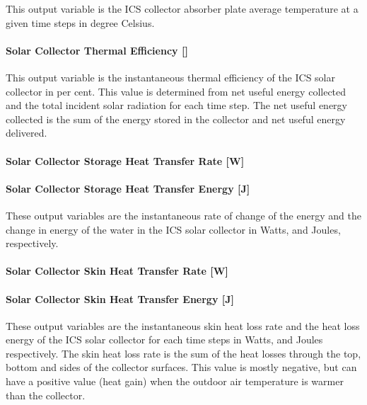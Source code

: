 This output variable is the ICS collector absorber plate average temperature at a given time steps in degree Celsius.

\paragraph{Solar Collector Thermal Efficiency {[]}}\label{solar-collector-thermal-efficiency}

This output variable is the instantaneous thermal efficiency of the ICS solar collector in per cent. This value is determined from net useful energy collected and the total incident solar radiation for each time step. The net useful energy collected is the sum of the energy stored in the collector and net useful energy delivered.

\paragraph{Solar Collector Storage Heat Transfer Rate {[}W{]}}\label{solar-collector-storage-heat-transfer-rate-w}

\paragraph{Solar Collector Storage Heat Transfer Energy {[}J{]}}\label{solar-collector-storage-heat-transfer-energy-j}

These output variables are the instantaneous rate of change of the energy and the change in energy of the water in the ICS solar collector in Watts, and Joules, respectively.

\paragraph{Solar Collector Skin Heat Transfer Rate {[}W{]}}\label{solar-collector-skin-heat-transfer-rate-w}

\paragraph{Solar Collector Skin Heat Transfer Energy {[}J{]}}\label{solar-collector-skin-heat-transfer-energy-j}

These output variables are the instantaneous skin heat loss rate and the heat loss energy of the ICS solar collector for each time steps in Watts, and Joules respectively. The skin heat loss rate is the sum of the heat losses through the top, bottom and sides of the collector surfaces. This value is mostly negative, but can have a positive value (heat gain) when the outdoor air temperature is warmer than the collector.

